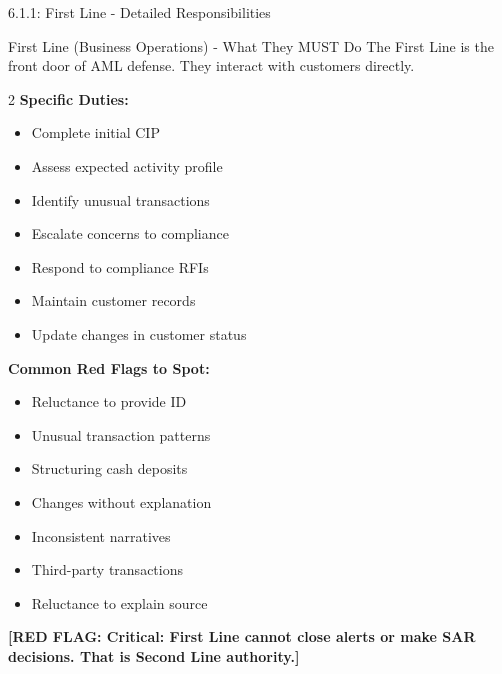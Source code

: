 \documentclass[11pt,a4paper]{beamer}
\newcommand{\redflag}[1]{\textcolor{red!80!black}{\textbf{[RED FLAG: #1]}}}
\begin{document}
\begin{frame}{6.1.1: First Line - Detailed Responsibilities}
	\begin{block}{First Line (Business Operations) - What They MUST Do}
		The First Line is the front door of AML defense. They interact with customers directly.
	\end{block}
	\begin{multicols}{2}
		\textbf{Specific Duties:}
		\begin{itemize}
			\item Complete initial CIP
			\item Assess expected activity profile
			\item Identify unusual transactions
			\item Escalate concerns to compliance
			\item Respond to compliance RFIs
			\item Maintain customer records
			\item Update changes in customer status
		\end{itemize}
		\columnbreak
		\textbf{Common Red Flags to Spot:}
		\begin{itemize}
			\item Reluctance to provide ID
			\item Unusual transaction patterns
			\item Structuring cash deposits
			\item Changes without explanation
			\item Inconsistent narratives
			\item Third-party transactions
			\item Reluctance to explain source
		\end{itemize}
	\end{multicols}
	\redflag{Critical: First Line cannot close alerts or make SAR decisions. That is Second Line authority.}
\end{frame}
\end{document}
